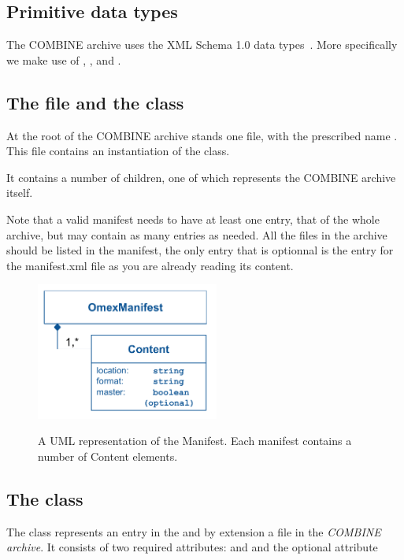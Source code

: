 \subsection{Primitive data types}
\label{primtypes}

The COMBINE archive uses the XML Schema 1.0 data types~\citep{biron:2000}.
More specifically we make use of , ,
and .


\subsection{The  file and the  class}
\label{manifest-class}

At the root of the COMBINE archive stands one file, with the prescribed name . This file contains an instantiation of the \OmexManifest class. 

It contains a number of \Content children, one of which represents the COMBINE archive itself. 

Note that a valid manifest needs to have at least one entry, that of the whole archive, but may 
contain as many entries as needed. All the files in the archive should be listed in the manifest, the only
entry that is optionnal is the entry for the manifest.xml file as you are already reading its content.

\begin{figure}[h!]
  \centering
  \includegraphics[width=6cm]{images/OmexManifest.pdf}\\
  \caption{A UML representation of the Manifest. Each manifest contains a number
	of Content elements.}
  \label{fig:combine_uml}
\end{figure}

\subsection{The  class}
\label{content-class}
The \Content class represents an entry in the \OmexManifest and by 
extension a file in the \textit{COMBINE archive}. It consists of two 
required attributes:  and  and the 
optional attribute  

